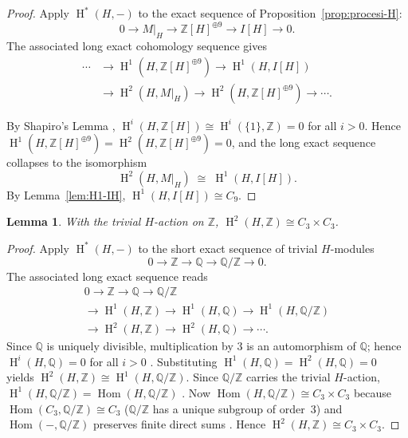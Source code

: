 \documentclass[12pt,a4paper]{article}
\newtheorem{lemma}[theorem]{Lemma}
\theoremstyle{definition}
\DeclareMathOperator{\Hom}{Hom}
\DeclareMathOperator{\coh}{H}
\begin{document}
\begin{proof}
Apply \(\coh^*(H,-)\) to the exact sequence of
Proposition~\ref{prop:procesi-H}:
\[
0 \longrightarrow M|_H \longrightarrow \mathbb{Z}[H]^{\oplus 9}
\longrightarrow I[H] \longrightarrow 0 .
\]
The associated long exact cohomology sequence gives
\[
\begin{aligned}
\cdots &\longrightarrow \coh^1(H, \mathbb{Z}[H]^{\oplus 9})
\longrightarrow \coh^1(H, I[H]) \\
&\longrightarrow \coh^2(H, M|_H)
\longrightarrow \coh^2(H, \mathbb{Z}[H]^{\oplus 9}) \longrightarrow \cdots .
\end{aligned}
\]

By Shapiro's Lemma \cite[Theorem~6.3.2]{Weibel1994},
\(\coh^i(H, \mathbb{Z}[H]) \cong \coh^i(\{1\}, \mathbb{Z}) = 0\) for all \(i >
0\). Hence \(\coh^1(H, \mathbb{Z}[H]^{\oplus 9}) = \coh^2(H,
\mathbb{Z}[H]^{\oplus 9}) = 0\), and the long exact sequence collapses to the
isomorphism
\[
\coh^2(H, M|_H) \;\cong\; \coh^1(H, I[H]).
\]
By Lemma~\ref{lem:H1-IH}, \(\coh^1(H, I[H]) \cong C_9\).
\end{proof}

\begin{lemma}\label{lem:H2-Z}
With the trivial \(H\)-action on \(\mathbb{Z}\),
\(\coh^2(H, \mathbb{Z}) \cong C_3 \times C_3\).
\end{lemma}

\begin{proof}
Apply \(\coh^*(H, -)\) to the short exact sequence of trivial \(H\)-modules
\[
0 \longrightarrow \mathbb{Z} \longrightarrow \mathbb{Q}
\longrightarrow \mathbb{Q}/\mathbb{Z} \longrightarrow 0 .
\]
The associated long exact sequence reads
\begin{multline*}
0 \longrightarrow \mathbb{Z} \longrightarrow \mathbb{Q}
\longrightarrow \mathbb{Q}/\mathbb{Z} \\
\longrightarrow \coh^1(H, \mathbb{Z})
\longrightarrow \coh^1(H, \mathbb{Q})
\longrightarrow \coh^1(H, \mathbb{Q}/\mathbb{Z}) \\
\longrightarrow \coh^2(H, \mathbb{Z})
\longrightarrow \coh^2(H, \mathbb{Q}) \longrightarrow \cdots .
\end{multline*}
Since \(\mathbb{Q}\) is uniquely divisible, multiplication by \(3\) is an
automorphism of \(\mathbb{Q}\); hence \(\coh^i(H, \mathbb{Q}) = 0\) for all
\(i > 0\) \cite[Proposition~1.6.2(c)]{NSW2020}.  Substituting
\(\coh^1(H, \mathbb{Q}) = \coh^2(H, \mathbb{Q}) = 0\) yields
\(\coh^2(H, \mathbb{Z}) \cong \coh^1(H, \mathbb{Q}/\mathbb{Z})\).
Since \(\mathbb{Q}/\mathbb{Z}\) carries the trivial \(H\)-action,
\(\coh^1(H, \mathbb{Q}/\mathbb{Z}) = \Hom(H, \mathbb{Q}/\mathbb{Z})\)
\cite[Corollary~6.4.6]{Weibel1994}.
Now \(\Hom(H, \mathbb{Q}/\mathbb{Z}) \cong C_3 \times C_3\) because
\(\Hom(C_3, \mathbb{Q}/\mathbb{Z}) \cong C_3\)
(\(\mathbb{Q}/\mathbb{Z}\) has a unique subgroup of order~\(3\))
and \(\Hom({-}, \mathbb{Q}/\mathbb{Z})\) preserves finite direct sums
\cite[Ch.II, \S1, no.6, Prop.6, Cor.1]{Bourbaki2007a}.
Hence \(\coh^2(H, \mathbb{Z}) \cong C_3 \times C_3\).
\end{proof}
\end{document}
